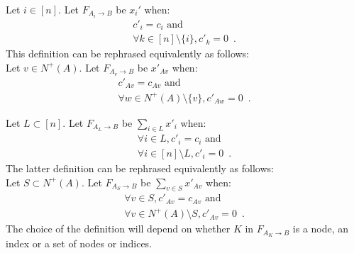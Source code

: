 \begin{definition} \ \\
  Let $i \in [n]$. Let $F_{A_i \rightarrow B}$ be $x_i'$ when:
  \begin{equation*}
  \begin{gathered}
    c'_i = c_i \mbox{ and} \\
    \forall k \in [n] \setminus \{i\}, c'_k = 0 \enspace.
  \end{gathered}
  \end{equation*}
  This definition can be rephrased equivalently as follows: \\
  Let $v \in N^{+}\left(A\right)$. Let $F_{A_v \rightarrow B}$ be $x'_{Av}$ when:
  \begin{equation*}
  \begin{gathered}
    c'_{Av} = c_{Av} \mbox{ and} \\
    \forall w \in N^{+}\left(A\right) \setminus \{v\}, c'_{Aw} = 0 \enspace.
  \end{gathered}
  \end{equation*}

  Let $L \subset [n]$. Let $F_{A_L \rightarrow B}$ be $\sum\limits_{i \in L}x'_i$ when:
  \begin{equation*}
  \begin{gathered}
    \forall i \in L, c'_i = c_i \mbox{ and} \\ 
    \forall i \in [n] \setminus L, c'_i = 0 \enspace.
  \end{gathered}
  \end{equation*} 
  The latter definition can be rephrased equivalently as follows: \\
  Let $S \subset N^{+}\left(A\right)$. Let $F_{A_S \rightarrow B}$ be
  $\sum\limits_{v \in S}x'_{Av}$ when:
  \begin{equation*}
  \begin{gathered}
    \forall v \in S, c'_{Av} = c_{Av} \mbox{ and} \\
    \forall v \in N^{+}\left(A\right) \setminus S, c'_{Av} = 0 \enspace.
  \end{gathered}
  \end{equation*}
  The choice of the definition will depend on whether $K$ in $F_{A_K \rightarrow B}$ is a node, an index or a set of nodes
  or indices.
\end{definition}
